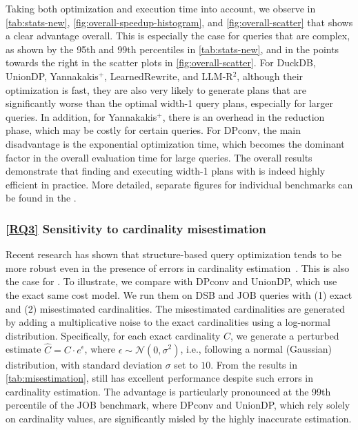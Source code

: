 Taking both optimization and execution time into account, we observe in \cref{tab:stats-new}, \cref{fig:overall-speedup-histogram}, and \cref{fig:overall-scatter} that \sys{} shows a clear advantage overall. This is especially the case for queries that are complex, as shown by the 95th and 99th percentiles in \cref{tab:stats-new}, and in the points towards the right in the scatter plots in \cref{fig:overall-scatter}. 
For DuckDB, UnionDP, Yannakakis$^+$, LearnedRewrite, and LLM-R$^2$, although their optimization is fast, they are also very likely to generate plans that are significantly worse than the optimal width-1 query plans, especially for larger queries.
In addition, for Yannakakis$^+$, there is an overhead in the reduction phase, which may be costly for certain queries.
For DPconv, the main disadvantage is the exponential optimization time, which becomes the dominant factor in the overall evaluation time for large queries.
The overall results demonstrate that finding and executing width-1 plans with \sys{} is indeed highly efficient in practice.
More detailed, separate figures for individual benchmarks can be found in the \arxivorappendix.

\subsubsection{\ref{RQ3} Sensitivity to cardinality misestimation}
Recent research has shown that structure-based query optimization tends to be more robust even in the presence of errors in cardinality estimation~\cite{wang_yannakakis_2025,DiamondJoin2024,RPT2025}.
This is also the case for \sys{}.
To illustrate, we compare \sys{} with DPconv and UnionDP, which use the exact same cost model. We run them on DSB and JOB queries with (1) exact and (2) misestimated cardinalities.
The misestimated cardinalities are generated by adding a multiplicative noise to the exact cardinalities using a log-normal distribution. Specifically, for each exact cardinality $C$, we generate a perturbed estimate $\hat{C} = C \cdot e^\epsilon$, where $\epsilon \sim \mathcal{N}(0, \sigma^2)$, i.e., following a normal (Gaussian) distribution, with standard deviation $\sigma$ set to $10$.
From the results in \cref{tab:misestimation}, \sys{} still has excellent performance despite such errors in cardinality estimation.
The advantage is particularly pronounced at the 99th percentile of the JOB benchmark, where DPconv and UnionDP, which rely solely on cardinality values, are significantly misled by the highly inaccurate estimation.

